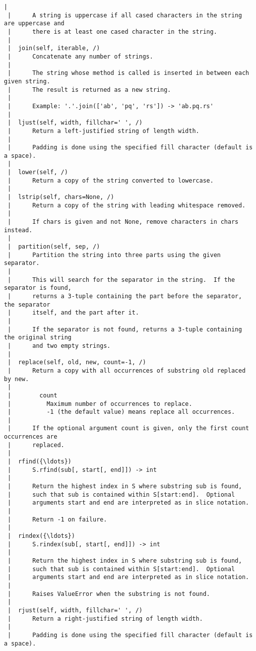\begin{Verbatim}[commandchars=\\\{\}]
 |      
 |      A string is uppercase if all cased characters in the string are uppercase and
 |      there is at least one cased character in the string.
 |  
 |  join(self, iterable, /)
 |      Concatenate any number of strings.
 |      
 |      The string whose method is called is inserted in between each given string.
 |      The result is returned as a new string.
 |      
 |      Example: '.'.join(['ab', 'pq', 'rs']) -> 'ab.pq.rs'
 |  
 |  ljust(self, width, fillchar=' ', /)
 |      Return a left-justified string of length width.
 |      
 |      Padding is done using the specified fill character (default is a space).
 |  
 |  lower(self, /)
 |      Return a copy of the string converted to lowercase.
 |  
 |  lstrip(self, chars=None, /)
 |      Return a copy of the string with leading whitespace removed.
 |      
 |      If chars is given and not None, remove characters in chars instead.
 |  
 |  partition(self, sep, /)
 |      Partition the string into three parts using the given separator.
 |      
 |      This will search for the separator in the string.  If the separator is found,
 |      returns a 3-tuple containing the part before the separator, the separator
 |      itself, and the part after it.
 |      
 |      If the separator is not found, returns a 3-tuple containing the original string
 |      and two empty strings.
 |  
 |  replace(self, old, new, count=-1, /)
 |      Return a copy with all occurrences of substring old replaced by new.
 |      
 |        count
 |          Maximum number of occurrences to replace.
 |          -1 (the default value) means replace all occurrences.
 |      
 |      If the optional argument count is given, only the first count occurrences are
 |      replaced.
 |  
 |  rfind({\ldots})
 |      S.rfind(sub[, start[, end]]) -> int
 |      
 |      Return the highest index in S where substring sub is found,
 |      such that sub is contained within S[start:end].  Optional
 |      arguments start and end are interpreted as in slice notation.
 |      
 |      Return -1 on failure.
 |  
 |  rindex({\ldots})
 |      S.rindex(sub[, start[, end]]) -> int
 |      
 |      Return the highest index in S where substring sub is found,
 |      such that sub is contained within S[start:end].  Optional
 |      arguments start and end are interpreted as in slice notation.
 |      
 |      Raises ValueError when the substring is not found.
 |  
 |  rjust(self, width, fillchar=' ', /)
 |      Return a right-justified string of length width.
 |      
 |      Padding is done using the specified fill character (default is a space).

\end{Verbatim}
